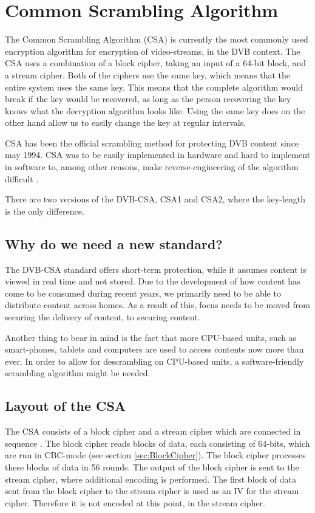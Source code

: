 \chapter{Common Scrambling Algorithm} \label{ch:CSA}
The Common Scrambling Algorithm (CSA) is currently the most commonly 
used encryption algorithm for encryption of video-streams, in the DVB 
context. The CSA uses a combination of a block cipher, taking an input 
of a 64-bit block, and a stream cipher. Both of the ciphers use the 
same key, which means that the entire system uses the same key. This 
means that the complete algorithm would break if the key would be 
recovered, as long as the person recovering the key knows what the 
decryption algorithm looks like. Using the same key does on the other 
hand allow us to easily change the key at regular intervals. 
\citep[pp. 271--272]{WeiLi:2007}

CSA has been the official scrambling method for protecting DVB content 
 since may 1994. CSA was to be easily implemented in hardware and hard 
to implement in software to, among other reasons, make 
reverse-engineering of the algorithm difficult \citep{DVBScene:2013}.

There are two versions of the DVB-CSA, CSA1 and CSA2, where the 
key-length is the only difference.
\citep[p. 23]{DVBScene:2013}

\section{Why do we need a new standard?}
The DVB-CSA standard offers short-term protection, while it assumes 
content is viewed in real time and not stored. Due to the development 
of how content has come to be consumed during recent years, we 
primarily need to be able to distribute content across homes. As a 
result of this, focus needs to be moved from securing the delivery of 
content, to securing content. \citep{Farncombe}

Another thing to bear in mind is the fact that more CPU-based units, 
such as smart-phones, tablets and computers are used to access contents 
now more than ever. In order to allow for descrambling on CPU-based 
units, a software-friendly scrambling algorithm might be needed.

\section{Layout of the CSA}
The CSA consists of a block cipher and a stream cipher which are 
connected in sequence \citep[p. 271]{WeiLi:2007}. The block cipher 
reads blocks of data, each consisting of 64-bits, which are run in 
CBC-mode (see section \ref{sec:BlockCipher}). The block cipher 
processes these blocks of data in 56 rounds. The output of the block 
cipher is sent to the stream cipher, where additional encoding is 
performed. The first block of data sent from the block cipher to the 
stream cipher is used as an IV for the stream cipher. Therefore it is 
not encoded at this point, in the stream cipher. 
\citep{DVBAnalysis:2006}


